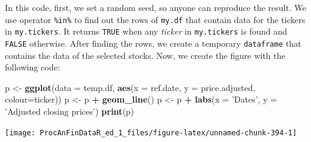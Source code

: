 \documentclass[11pt,]{book}
\newenvironment{Shaded}{\begin{snugshade}}{\end{snugshade}}
\newcommand{\KeywordTok}[1]{\textcolor[rgb]{0.27,0.27,0.27}{\textbf{#1}}}
\newcommand{\DataTypeTok}[1]{\textcolor[rgb]{0.27,0.27,0.27}{#1}}
\newcommand{\DecValTok}[1]{\textcolor[rgb]{0.06,0.06,0.06}{#1}}
\newcommand{\StringTok}[1]{\textcolor[rgb]{0.5,0.5,0.5}{#1}}
\newcommand{\CommentTok}[1]{\textcolor[rgb]{0.56,0.35,0.01}{\textit{#1}}}
\newcommand{\OperatorTok}[1]{\textcolor[rgb]{0.81,0.36,0.00}{\textbf{#1}}}
\newcommand{\NormalTok}[1]{#1}
\begin{document}
\begin{Shaded}
\end{Shaded}

In this code, first, we set a random seed, so anyone can reproduce the
result. We use operator \texttt{\%in\%} to find out the rows of
\texttt{my.df} that contain data for the tickers in \texttt{my.tickers}.
It returns \texttt{TRUE} when any \emph{ticker} in \texttt{my.tickers}
is found and \texttt{FALSE} otherwise. After finding the rows, we create
a temporary \texttt{dataframe} that contains the data of the selected
stocks. Now, we create the figure with the following code:

\begin{Shaded}
\begin{Highlighting}[]
\NormalTok{p <-}\StringTok{ }\KeywordTok{ggplot}\NormalTok{(}\DataTypeTok{data =}\NormalTok{ temp.df, }\KeywordTok{aes}\NormalTok{(}\DataTypeTok{x =}\NormalTok{ ref.date, }
                                \DataTypeTok{y =}\NormalTok{ price.adjusted, }
                                \DataTypeTok{colour=}\NormalTok{ticker))}
\NormalTok{p <-}\StringTok{ }\NormalTok{p }\OperatorTok{+}\StringTok{ }\KeywordTok{geom_line}\NormalTok{()}
\NormalTok{p <-}\StringTok{ }\NormalTok{p }\OperatorTok{+}\StringTok{ }\KeywordTok{labs}\NormalTok{(}\DataTypeTok{x =} \StringTok{'Dates'}\NormalTok{, }\DataTypeTok{y =} \StringTok{'Adjusted closing prices'}\NormalTok{)}
\KeywordTok{print}\NormalTok{(p)}
\end{Highlighting}
\end{Shaded}

\begin{center}\texttt{[image: ProcAnFinDataR\_ed\_1\_files/figure-latex/unnamed-chunk-394-1]} \end{center}
\end{document}

